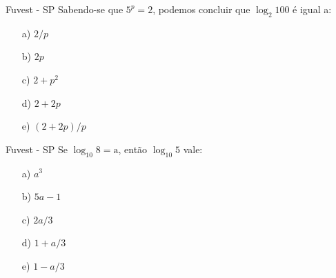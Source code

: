 \documentclass[12pt]{beamer}
\begin{document}
	\begin{frame}{Fuvest - SP}
		Sabendo-se que $5^{p}=2$, podemos concluir que $\log_{2}100$ é igual a:
		
		\begin{itemize}
			\item [a)] ${2}/{p}$
			\item [b)] $2p$
			\item [c)] $2+p^{2}$
			\item [d)] $2+2p$
			\item [e)] ${(2+2p)}/{p}$ %
		\end{itemize}
	\end{frame}
	
	\begin{frame}{Fuvest - SP}
		Se $\log_{10}8=\text{a}$, então $\log_{10}5$ vale:
		
		\begin{itemize}
			\item [a)] $a^{3}$
			\item [b)] $5a-1$
			\item [c)] ${2a}/{3}$
			\item [d)] $1+{a}/{3}$
			\item [e)] $1-{a}/{3}$ %
		\end{itemize}
	\end{frame}
\end{document}
